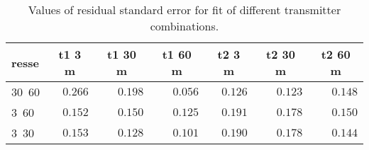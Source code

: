 %
\begin{table}[!tbp]
\caption{Values of residual standard error for fit of different transmitter combinations.\label{tab:resse}} 
\begin{center}
\begin{tabular}{lrrrrrr}
\hline\hline
\multicolumn{1}{l}{resse}&\multicolumn{1}{c}{t1 3 m}&\multicolumn{1}{c}{t1 30 m}&\multicolumn{1}{c}{t1 60 m}&\multicolumn{1}{c}{t2 3 m}&\multicolumn{1}{c}{t2 30 m}&\multicolumn{1}{c}{t2 60 m}\tabularnewline
\hline
30~60&$0.266$&$0.198$&$0.056$&$0.126$&$0.123$&$0.148$\tabularnewline
3~60&$0.152$&$0.150$&$0.125$&$0.191$&$0.178$&$0.150$\tabularnewline
3~30&$0.153$&$0.128$&$0.101$&$0.190$&$0.178$&$0.144$\tabularnewline
\hline
\end{tabular}
\end{center}
\end{table}

